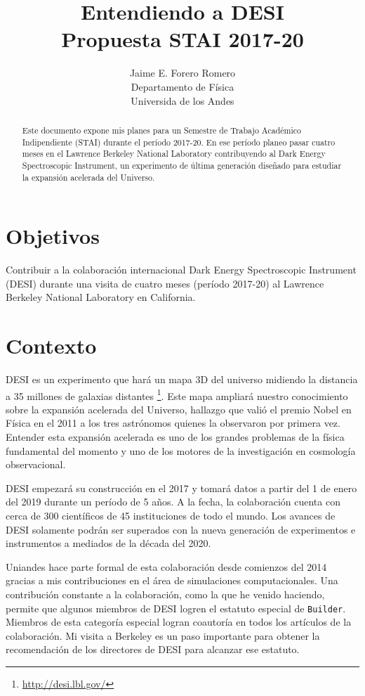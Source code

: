 \documentclass[12pt,spanish]{article}
\title{{\sc Entendiendo a DESI}\\{\small\sc Propuesta STAI 2017-20}}
\author{Jaime E. Forero Romero\\Departamento de F\'isica\\Universida
  de los Andes}
\begin{document}
\maketitle
\begin{abstract}
Este documento expone mis planes para un Semestre de Trabajo Acad\'emico
Indipendiente (STAI) durante el per\'iodo 2017-20. 
En ese per\'iodo planeo pasar cuatro meses en el Lawrence Berkeley
National Laboratory contribuyendo al Dark Energy Spectroscopic
Instrument, un experimento de \'ultima generaci\'on dise\~nado para
estudiar la expansi\'on acelerada del Universo.
\end{abstract}





\section*{Objetivos}

Contribuir a la colaboraci\'on internacional Dark Energy Spectroscopic
Instrument (DESI) durante una visita de cuatro meses (per\'iodo
2017-20) al Lawrence Berkeley National Laboratory en California.  


\section*{Contexto}
DESI es un experimento que har\'a un mapa 3D del universo midiendo la
distancia a 35 millones de galaxias
distantes \footnote{\url{http://desi.lbl.gov/}}. 
Este mapa ampliar\'a nuestro conocimiento sobre la
expansi\'on acelerada del Universo, hallazgo que vali\'o el premio
Nobel en  F\'isica en el 2011 a los tres astr\'onomos quienes la observaron
por primera vez. Entender esta  expansi\'on acelerada es uno de los
grandes problemas de la f\'isica fundamental del momento y uno de los
motores de la investigaci\'on en cosmolog\'ia observacional.



DESI empezar\'a su construcci\'on en el 2017 y tomar\'a datos a
partir del 1 de enero del 2019 durante un per\'iodo de 5 a\~nos. 
A la fecha, la colaboraci\'on cuenta con cerca de 300 cient\'ificos de
45 instituciones de todo el mundo. 
Los avances de DESI solamente podr\'an  ser superados con la nueva
generaci\'on de experimentos e instrumentos a mediados de la d\'ecada
del 2020. 

Uniandes hace parte formal de esta colaboraci\'on desde comienzos del
2014 gracias a mis contribuciones en el \'area de simulaciones
computacionales. 
Una contribuci\'on constante a la colaboraci\'on, como la que he
venido haciendo, permite que algunos miembros de DESI logren el
estatuto especial de \texttt{Builder}. Miembros de esta 
categor\'ia especial logran coautor\'ia en todos los art\'iculos de la
colaboraci\'on. Mi visita a Berkeley es un paso importante para
obtener la recomendaci\'on de los directores de DESI para
alcanzar ese estatuto.
\end{document}

